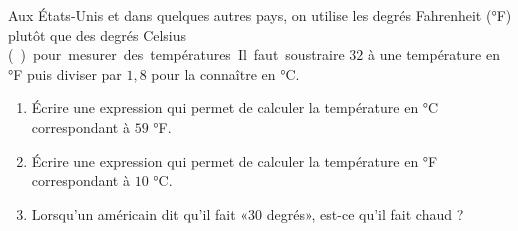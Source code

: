 
\begin{exercice}\label{exosmath-0734}

Aux États-Unis et dans quelques autres pays, on utilise les degrés Fahrenheit (°F) plutôt que des degrés Celsius (\si\degreecelsius) pour mesurer des températures. Il faut soustraire $32$ à une température en °F puis diviser par $1,8$ pour la connaître en °C.  

\begin{enumerate}
    \item
Écrire une expression qui permet de calculer la température en °C correspondant à $59$ °F.
\item
Écrire une expression qui permet de calculer la température en °F correspondant à $10$ °C.
\item
    Lorsqu'un américain dit qu'il fait «\( 30\) degrés», est-ce qu'il fait chaud ?
\end{enumerate}

\end{exercice}

